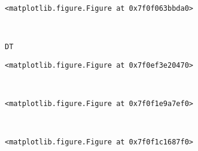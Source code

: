 \documentclass[11pt]{article}
\begin{document}
    
    \begin{center}
    \end{center}
    { \hspace*{\fill} \\}
    
    
    \begin{verbatim}
<matplotlib.figure.Figure at 0x7f0f063bbda0>
    \end{verbatim}

    
    \begin{center}
    \end{center}
    { \hspace*{\fill} \\}
    
    \begin{Verbatim}[commandchars=\\\{\}]
DT

    \end{Verbatim}

    
    \begin{verbatim}
<matplotlib.figure.Figure at 0x7f0ef3e20470>
    \end{verbatim}

    
    \begin{center}
    \end{center}
    { \hspace*{\fill} \\}
    
    
    \begin{verbatim}
<matplotlib.figure.Figure at 0x7f0f1e9a7ef0>
    \end{verbatim}

    
    \begin{center}
    \end{center}
    { \hspace*{\fill} \\}
    
    
    \begin{verbatim}
<matplotlib.figure.Figure at 0x7f0f1c1687f0>
    \end{verbatim}

    
    \begin{center}
    \end{center}
    { \hspace*{\fill} \\}
    
\end{document}
